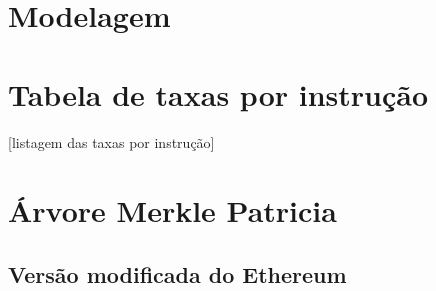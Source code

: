 \documentclass[tcc,capa]{texufpel}
\begin{document}
\chapter{Modelagem}










 

%

\annex
\chapter{Tabela de taxas por instrução}\label{annx:taxas-por-instrução}

[listagem das taxas por instrução]

\chapter{Árvore Merkle Patricia}\label{annx:arvore-merkle-patricia}

\section{Versão modificada do Ethereum}
\end{document}
